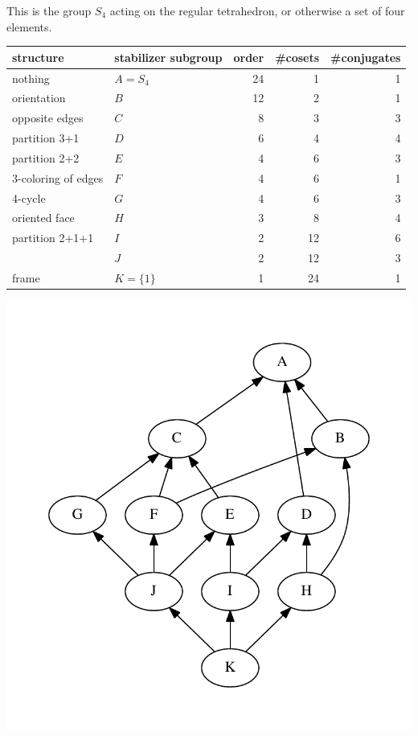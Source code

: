 \documentclass[11pt,oneside]{article}
\begin{document}
This is the group $S_4$ acting on the regular tetrahedron,
or otherwise a set of four elements.

\begin{samepage}
\begin{center}
\begin{tabular}{ |l|l|r|r|r| }
\hline
structure & stabilizer subgroup & order & \#cosets & \#conjugates \\
\hline
\hline
nothing & $A=S_4$ &       24        &  1      &   1         \\
\hline
orientation & $B$ &       12        &  2      &   1         \\
\hline
opposite edges & $C$ &       8        &  3      &   3         \\
\hline
partition 3+1 & $D$ &       6        &  4      &   4         \\
\hline
partition 2+2 & $E$ &       4        &  6      &   3      \\
\hline
3-coloring of edges & $F$ &       4        &  6      &   1     \\
\hline
4-cycle & $G$ &       4        &  6      &   3    \\
\hline
oriented face & $H$ &       3        &  8      &   4         \\
\hline
partition 2+1+1 & $I$ &       2        &  12      &   6       \\
\hline
   & $J$ &       2        &  12      &    3       \\
\hline
frame & $K=\{1\} $ &       1        &  24      &   1         \\
\hline
\end{tabular}
\end{center}
\end{samepage}

\begin{center}
\includegraphics[width=0.5\columnwidth]{subgroups_s4.pdf} 
\end{center}
\end{document}
